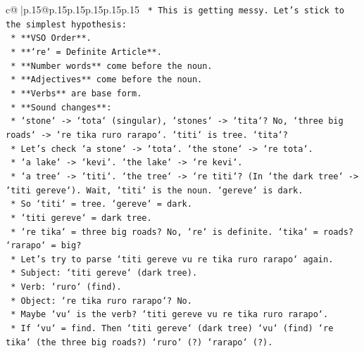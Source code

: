 \documentclass{article}
\begin{document}
{\begin{supertabular}{c@{$\;$}|p{.15\linewidth}@{}p{.15\linewidth}p{.15\linewidth}p{.15\linewidth}p{.15\linewidth}p{.15\linewidth}}
{{{\texttt{                *   This is getting messy. Let's stick to the simplest hypothesis:} \\
\texttt{                    *   **VSO Order**.} \\
\texttt{                    *   **`re` = Definite Article**.} \\
\texttt{                    *   **Number words** come before the noun.} \\
\texttt{                    *   **Adjectives** come before the noun.} \\
\texttt{                    *   **Verbs** are base form.} \\
\texttt{                    *   **Sound changes**:} \\
\texttt{                        *   `stone` {-}> `tota` (singular), `stones` {-}> `tita`? No, `three big roads` {-}> `re tika ruro rarapo`. `titi` is tree. `tita`?} \\
\texttt{                        *   Let's check `a stone` {-}> `tota`. `the stone` {-}> `re tota`.} \\
\texttt{                        *   `a lake` {-}> `kevi`. `the lake` {-}> `re kevi`.} \\
\texttt{                        *   `a tree` {-}> `titi`. `the tree` {-}> `re titi`? (In `the dark tree` {-}> `titi gereve`). Wait, `titi` is the noun. `gereve` is dark.} \\
\texttt{                        *   So `titi` = tree. `gereve` = dark.} \\
\texttt{                        *   `titi gereve` = dark tree.} \\
\texttt{                        *   `re tika` = three big roads? No, `re` is definite. `tika` = roads? `rarapo` = big?} \\
\texttt{                        *   Let's try to parse `titi gereve vu re tika ruro rarapo` again.} \\
\texttt{                            *   Subject: `titi gereve` (dark tree).} \\
\texttt{                            *   Verb: `ruro` (find).} \\
\texttt{                            *   Object: `re tika ruro rarapo`? No.} \\
\texttt{                            *   Maybe `vu` is the verb? `titi gereve vu re tika ruro rarapo`.} \\
\texttt{                            *   If `vu` = find. Then `titi gereve` (dark tree) `vu` (find) `re tika` (the three big roads?) `ruro` (?) `rarapo` (?).} \\
}}}
\end{supertabular}}
\end{document}
